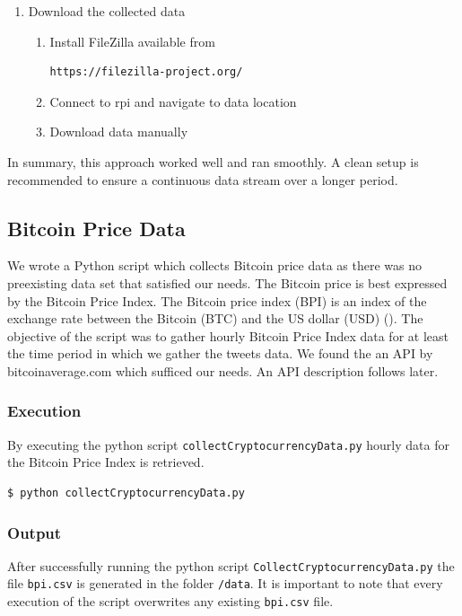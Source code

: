 \documentclass[a4paper,12pt]{article}
\begin{document}
\begin{spacing}{1.2}
\begin{enumerate}
\item Download the collected data
\begin{enumerate}
\item Install FileZilla available from
\begin{lstlisting}[language=bash] 
https://filezilla-project.org/
\end{lstlisting}
\item Connect to rpi and navigate to data location \newline
\item Download data manually \newline \newline \end{enumerate}
\end{enumerate}
In summary, this approach worked well and ran smoothly. A clean setup is recommended to ensure a continuous data stream over a longer period.


\subsection{Bitcoin Price Data}
We wrote a Python script which collects Bitcoin price data as there was no preexisting data set that satisfied our needs. The Bitcoin price is best expressed by the Bitcoin Price Index. The Bitcoin price index (BPI) is an index of the exchange rate between the Bitcoin (BTC) and the US dollar (USD) (\cite{kristoufek2015main}). The objective of the script was to gather hourly Bitcoin Price Index data for at least the time period in which we gather the tweets data. We found the an API by bitcoinaverage.com which sufficed our needs. An API description follows later.

\subsubsection{Execution}
By executing the python script \verb|collectCryptocurrencyData.py| hourly data for the Bitcoin Price Index is retrieved.
\begin{lstlisting}[language=bash]
    $ python collectCryptocurrencyData.py
\end{lstlisting}

\subsubsection{Output}
After successfully running the python script \verb|CollectCryptocurrencyData.py| the file \verb|bpi.csv| is generated in the folder \verb|/data|. It is important to note that every execution of the script overwrites any existing \verb|bpi.csv| file.


\end{spacing}
\end{document}
